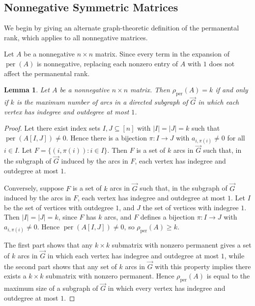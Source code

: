 \documentclass[11pt]{article}
\DeclareMathOperator{\per}{per}
\theoremstyle{plain}
\newtheorem{lemma}[theorem]{Lemma}
\theoremstyle{definition}
\theoremstyle{remark}
\begin{document}
\subsection{Nonnegative Symmetric Matrices}
We begin by giving an alternate graph-theoretic definition of the permanental rank,
which applies to all nonnegative matrices.

Let \( A \) be a nonnegative \( n \times n \) matrix.
Since every term in the expansion of \(\per(A)\) is nonnegative, replacing each
nonzero entry of \(A\) with \(1\) does not affect the permanental rank.

\begin{lemma}\label{lemma:perm-rank}
Let \(A\) be a nonnegative \(n\times n\) matrix.
Then \(\rho_{\operatorname{per}}(A)=k\) if and only if \(k\) is the maximum number of
arcs in a directed subgraph of \(\vec G\) in which each vertex has indegree and
outdegree at most \(1\).
\end{lemma}



\begin{proof}
Let there exist index sets \(I,J\subseteq[n]\) with \(|I|=|J|=k\) such that
\(\per(A[I,J])\neq 0\).
Hence there is a bijection \(\pi:I\to J\) with \(a_{i,\pi(i)}\neq 0\) for all
\(i\in I\).
Let
\(
F=\{(i,\pi(i)) : i\in I\}.
\)
Then \(F\) is a set of \(k\) arcs in \(\vec G\) such that, in the subgraph of
\(\vec G\) induced by the arcs in \(F\), each vertex has indegree and outdegree at most \(1\).

Conversely, suppose \(F\) is a set of \(k\) arcs in \(\vec G\) such that, in the
subgraph of \(\vec G\) induced by the arcs in \(F\), each vertex has indegree and outdegree at
most \(1\).
Let \(I\) be the set of vertices with outdegree \(1\), and \(J\) the set of
vertices with indegree \(1\).
Then \(|I|=|J|=k\), since \(F\) has \(k\) arcs, and \(F\) defines a bijection \(\pi:I\to J\) with
\(a_{i,\pi(i)}\neq 0\).
Hence \(\per(A[I,J])\neq 0\), so \(\rho_{\operatorname{per}}(A)\ge k\).

The first part shows that any \(k\times k\) submatrix with nonzero permanent
gives a set of \(k\) arcs in \(\vec G\) in which each vertex has indegree
and outdegree at most \(1\), while the second part shows that any set of \(k\)
arcs in \(\vec G\) with this property implies there exists a \(k\times k\) submatrix with
nonzero permanent. Hence \(\rho_{\operatorname{per}}(A)\) is equal to the maximum
size of a subgraph of \(\vec G\) in which every vertex has indegree and outdegree
at most \(1\).
\end{proof}
\end{document}

